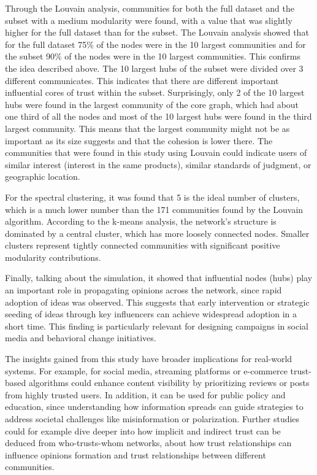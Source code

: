\documentclass[conference]{IEEEtran}
\begin{document}
Through the Louvain analysis, communities for both the full dataset and the subset with a medium modularity were found, with a value that was slightly higher for the full dataset than for the subset. The Louvain analysis showed that for the full dataset 75\% of the nodes were in the 10 largest communities and for the subset 90\% of the nodes were in the 10 largest communities. This confirms the idea described above. The 10 largest hubs of the subset were divided over 3 different communicates. This indicates that there are different important influential cores of trust within the subset. Surprisingly, only 2 of the 10 largest hubs were found in the largest community of the core graph, which had about one third of all the nodes and most of the 10 largest hubs were found in the third largest community. This means that the largest community might not be as important as its size suggests and that the cohesion is lower there. The communities that were found in this study using Louvain could indicate  users of similar interest (interest in the same products), similar standards of judgment, or geographic location. 

For the spectral clustering, it was found that 5 is the ideal number of clusters, which is a much lower number than the 171 communities found by the Louvain algorithm. According to the k-means analysis, the network’s structure is dominated by a central cluster, which has more loosely connected nodes. Smaller clusters represent tightly connected communities with significant positive modularity contributions. 

Finally, talking about the simulation, it showed that influential nodes (hubs) play an important role in propagating opinions across the network, since rapid adoption of ideas was observed. This suggests that early intervention or strategic seeding of ideas through key influencers can achieve widespread adoption in a short time. This finding is particularly relevant for designing campaigns in social media and behavioral change initiatives.

The insights gained from this study have broader implications for real-world systems. For example, for social media, streaming platforms or e-commerce trust-based algorithms could enhance content visibility by prioritizing reviews or posts from highly trusted users. In addition, it can be used for public policy and education, since understanding how information spreads can guide strategies to address societal challenges like misinformation or polarization. Further studies could for example dive deeper into how implicit and indirect trust can be deduced from who-trusts-whom networks, about how trust relationships can influence opinions formation and trust relationships between different communities. 


\printbibliography 
\end{document}
